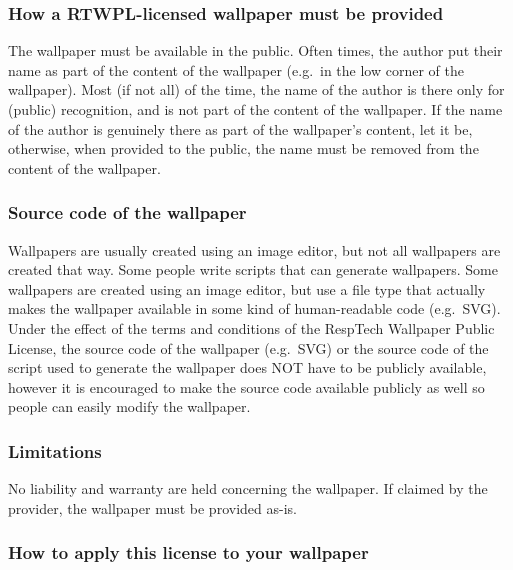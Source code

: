 \documentclass[]{article}
\begin{document}
\hypertarget{how-a-rtwpl-licensed-wallpaper-must-be-provided}{%
\subsubsection{How a RTWPL-licensed wallpaper must be
provided}\label{how-a-rtwpl-licensed-wallpaper-must-be-provided}}

The wallpaper must be available in the public. Often times, the author
put their name as part of the content of the wallpaper (e.g.~in the low
corner of the wallpaper). Most (if not all) of the time, the name of the
author is there only for (public) recognition, and is not part of the
content of the wallpaper. If the name of the author is genuinely there
as part of the wallpaper's content, let it be, otherwise, when provided
to the public, the name must be removed from the content of the
wallpaper.

\hypertarget{source-code-of-the-wallpaper}{%
\subsubsection{Source code of the
wallpaper}\label{source-code-of-the-wallpaper}}

Wallpapers are usually created using an image editor, but not all
wallpapers are created that way. Some people write scripts that can
generate wallpapers. Some wallpapers are created using an image editor,
but use a file type that actually makes the wallpaper available in some
kind of human-readable code (e.g.~SVG). Under the effect of the terms
and conditions of the RespTech Wallpaper Public License, the source code
of the wallpaper (e.g.~SVG) or the source code of the script used to
generate the wallpaper does NOT have to be publicly available, however
it is encouraged to make the source code available publicly as well so
people can easily modify the wallpaper.

\hypertarget{limitations}{%
\subsubsection{Limitations}\label{limitations}}

No liability and warranty are held concerning the wallpaper. If claimed
by the provider, the wallpaper must be provided as-is.

\hypertarget{how-to-apply-this-license-to-your-wallpaper}{%
\subsubsection{How to apply this license to your
wallpaper}\label{how-to-apply-this-license-to-your-wallpaper}}
\end{document}

